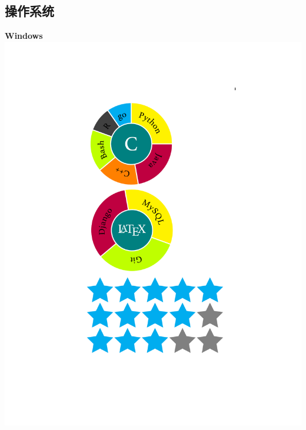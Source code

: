\documentclass[]{friggeri-cv}
\begin{document}
\begin{aside}
  \section{\cuti 操作系统}
    \textbf{Windows}\includegraphics[scale=0.16]{img/5stars}

\end{aside}
\end{document}
